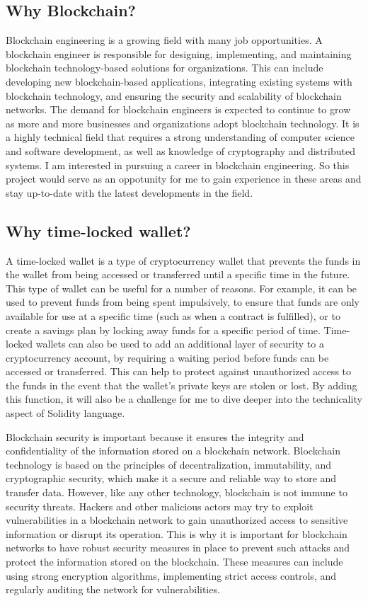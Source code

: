 \documentclass[10pt,twocolumn]{article}
\begin{document}
\subsection{Why Blockchain?}
Blockchain engineering is a growing field with many job opportunities. A blockchain engineer is responsible for designing, implementing, and maintaining blockchain technology-based solutions for organizations. This can include developing new blockchain-based applications, integrating existing systems with blockchain technology, and ensuring the security and scalability of blockchain networks. The demand for blockchain engineers is expected to continue to grow as more and more businesses and organizations adopt blockchain technology. It is a highly technical field that requires a strong understanding of computer science and software development, as well as knowledge of cryptography and distributed systems. I am interested in pursuing a career in blockchain engineering. So this project would serve as an oppotunity for me to gain experience in these areas and stay up-to-date with the latest developments in the field.

\subsection{Why time-locked wallet?}

A time-locked wallet is a type of cryptocurrency wallet that prevents the funds in the wallet from being accessed or transferred until a specific time in the future. This type of wallet can be useful for a number of reasons. For example, it can be used to prevent funds from being spent impulsively, to ensure that funds are only available for use at a specific time (such as when a contract is fulfilled), or to create a savings plan by locking away funds for a specific period of time. Time-locked wallets can also be used to add an additional layer of security to a cryptocurrency account, by requiring a waiting period before funds can be accessed or transferred. This can help to protect against unauthorized access to the funds in the event that the wallet's private keys are stolen or lost. By adding this function, it will also be a challenge for me to dive deeper into the technicality aspect of Solidity language.

Blockchain security is important because it ensures the integrity and confidentiality of the information stored on a blockchain network. Blockchain technology is based on the principles of decentralization, immutability, and cryptographic security, which make it a secure and reliable way to store and transfer data. However, like any other technology, blockchain is not immune to security threats. Hackers and other malicious actors may try to exploit vulnerabilities in a blockchain network to gain unauthorized access to sensitive information or disrupt its operation. This is why it is important for blockchain networks to have robust security measures in place to prevent such attacks and protect the information stored on the blockchain. These measures can include using strong encryption algorithms, implementing strict access controls, and regularly auditing the network for vulnerabilities.
\end{document}
